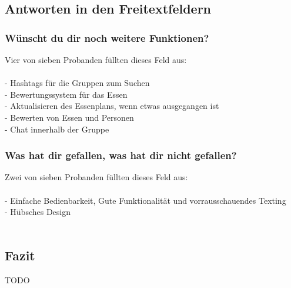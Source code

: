 \documentclass[a4paper]{scrreprt}
\begin{document}
\newpage
\subsection*{Antworten in den Freitextfeldern}

\subsubsection*{Wünscht du dir noch weitere Funktionen?}
Vier von sieben Probanden füllten dieses Feld aus: \\
\ \\
- Hashtags für die Gruppen zum Suchen \\
- Bewertungssystem für das Essen \\
- Aktualisieren des Essenplans, wenn etwas ausgegangen ist \\ 
- Bewerten von Essen und Personen \\
- Chat innerhalb der Gruppe

\subsubsection*{Was hat dir gefallen, was hat dir nicht gefallen?}
Zwei von sieben Probanden füllten dieses Feld aus: \\
\ \\
- Einfache Bedienbarkeit, Gute Funktionalität und vorrausschauendes Texting \\
- Hübsches Design \\
\ \\
\subsection*{Fazit}

TODO


\printglossaries
\end{document}
